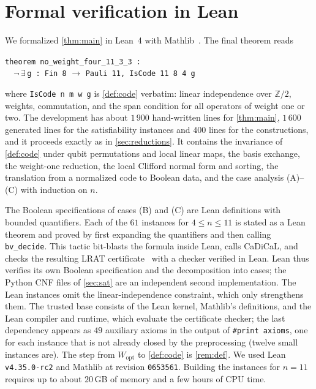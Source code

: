 \documentclass[a4paper,onecolumn,unpublished]{quantumarticle}
\theoremstyle{definition}
\theoremstyle{remark}
\newcommand{\Wopt}{W_{\mathrm{opt}}}
\begin{document}
\section{Formal verification in Lean}
\label{sec:lean}

We formalized \cref{thm:main} in Lean~4 with Mathlib~\cite{Lean4,Mathlib}. The final theorem
reads
\begin{center}
\texttt{theorem no\_weight\_four\_11\_3\_3 :}\\
\texttt{\ \ }$\neg\,\exists$\,\texttt{g :\ Fin 8} $\to$ \texttt{Pauli 11, IsCode 11 8 4 g}
\end{center}
where \texttt{IsCode n m w g} is \cref{def:code} verbatim: linear independence over
$\mathbb{Z}/2$, weights, commutation, and the span condition for all operators of weight one or
two. The development has about $1\,900$ hand-written lines for \cref{thm:main}, $1\,600$
generated lines for the satisfiability instances and $400$ lines for the constructions, and it
proceeds exactly as in \cref{sec:reductions}. It contains the invariance of \cref{def:code} under qubit permutations and
local linear maps, the basis exchange, the weight-one reduction, the local Clifford normal form
and sorting, the translation from a normalized code to Boolean data, and the case analysis
(A)--(C) with induction on $n$.

The Boolean specifications of cases (B) and (C) are Lean definitions with bounded quantifiers.
Each of the $61$ instances for $4\le n\le11$ is stated as a Lean theorem and proved by first
expanding the quantifiers and then calling \texttt{bv\_decide}. This tactic bit-blasts the formula
inside Lean, calls CaDiCaL, and checks the resulting LRAT certificate~\cite{CHHKS17} with a checker
verified in Lean. Lean thus verifies its own Boolean specification and the decomposition into
cases; the Python CNF files of \cref{sec:sat} are an independent second implementation. The
Lean instances omit the linear-independence constraint, which only strengthens them. The trusted
base consists of the Lean kernel, Mathlib's definitions, and the Lean compiler and runtime, which
evaluate the certificate checker; the last dependency appears as $49$ auxiliary axioms in the
output of \texttt{\#print axioms}, one for each instance that is not already closed by the
preprocessing (twelve small instances are). The step from $\Wopt$ to \cref{def:code} is
\cref{rem:def}. We used Lean \texttt{v4.35.0-rc2} and Mathlib at revision
\texttt{0653561}. Building the instances for $n=11$ requires up to about $20$\,GB of memory
and a few hours of CPU time.
\end{document}
